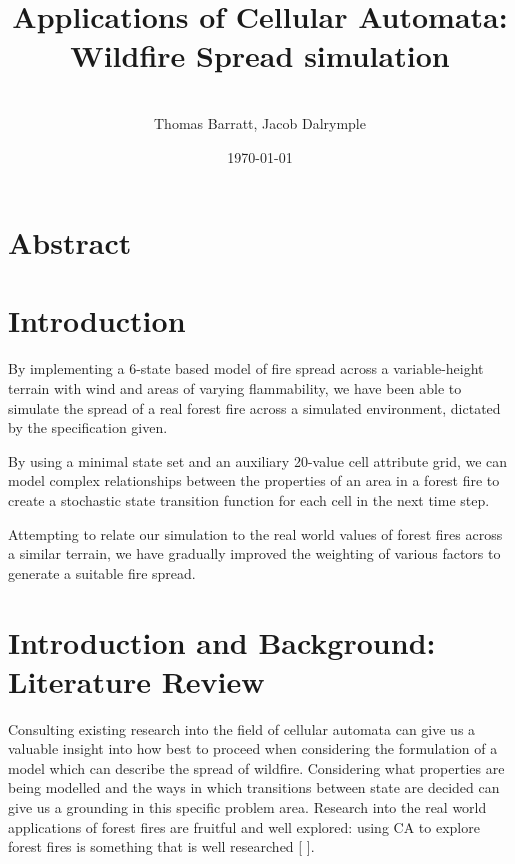 \documentclass[11pt, a4paper, titlepage]{article}
\date{}
\title{ \textbf{Applications of Cellular Automata: Wildfire Spread simulation} \\  }
\author{\\ \Large{Thomas Barratt, Jacob Dalrymple  } }
\date{\today}
\begin{document}
\maketitle

\newpage

\section{Abstract}

\section{Introduction}
By implementing a 6-state based model of fire spread across a variable-height terrain with wind and areas of varying flammability, we have been able to simulate the spread of a real forest fire across a simulated environment, dictated by the specification given.

By using a minimal state set and an auxiliary 20-value cell attribute grid, we can model complex relationships between the properties of an area in a forest fire to create a stochastic state transition function for each cell in the next time step.

Attempting to relate our simulation to the real world values of forest fires across a similar terrain, we have gradually improved the weighting of various factors to generate a suitable fire spread. 

\section{Introduction and Background: Literature Review}
Consulting existing research into the field of cellular automata can give us a valuable insight into how best to proceed when considering the formulation of a model which can describe the spread of wildfire. Considering what properties are being modelled and the ways in which transitions between state are decided can give us a grounding in this specific problem area. Research into the real world applications of forest fires are fruitful and well explored: using CA to explore forest fires is something that is well researched [\cite{ntinas2017parallel}
\cite{clarke1994cellular}
\cite{trunfio2011new}].
\end{document}
